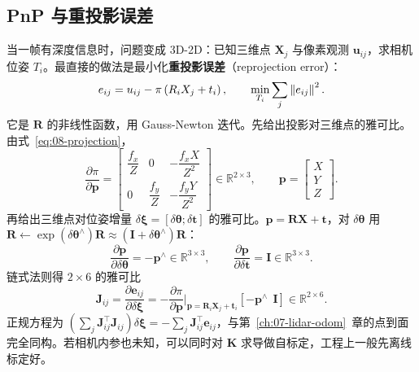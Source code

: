 \subsection{PnP 与重投影误差}

当一帧有深度信息时，问题变成 3D-2D：已知三维点 $\bm{X}_j$ 与像素观测 $\bm{u}_{ij}$，求相机位姿 $T_i$。最直接的做法是最小化\textbf{重投影误差}（reprojection error）：
\begin{equation}
  e_{ij} = u_{ij}-\pi\left(R_iX_j+t_i\right),
  \qquad
  \min_{T_i}\sum_j\left\lVert e_{ij} \right\rVert^{2}.
  \label{eq:08-reproj}
\end{equation}
它是 $\bm{R}$ 的非线性函数，用 Gauss-Newton 迭代。先给出投影对三维点的雅可比。由式~\eqref{eq:08-projection}，
\begin{equation}
  \frac{\partial\pi}{\partial\bm{p}}
  = \begin{bmatrix}
    \dfrac{f_x}{Z} & 0 & -\dfrac{f_xX}{Z^{2}}\\[2mm]
    0 & \dfrac{f_y}{Z} & -\dfrac{f_yY}{Z^{2}}
  \end{bmatrix}\in\mathbb{R}^{2\times3},
  \qquad \bm{p}=\begin{bmatrix}X\\Y\\Z\end{bmatrix}.
  \label{eq:08-dpi-dp}
\end{equation}
再给出三维点对位姿增量 $\delta\bm{\xi}=[\delta\bm{\theta};\delta\bm{t}]$ 的雅可比。$\bm{p}=\bm{R}\bm{X}+\bm{t}$，对 $\delta\bm{\theta}$ 用 $\bm{R}\leftarrow\exp(\delta\bm{\theta}^{\wedge})\bm{R}\approx(\bm{I}+\delta\bm{\theta}^{\wedge})\bm{R}$：
\begin{equation}
  \frac{\partial\bm{p}}{\partial\delta\bm{\theta}}=-\bm{p}^{\wedge}\in\mathbb{R}^{3\times3},
  \qquad
  \frac{\partial\bm{p}}{\partial\delta\bm{t}}=\bm{I}\in\mathbb{R}^{3\times3}.
\end{equation}
链式法则得 $2\times6$ 的雅可比
\begin{equation}
  \bm{J}_{ij}=\frac{\partial\bm{e}_{ij}}{\partial\delta\bm{\xi}}
  = -\frac{\partial\pi}{\partial\bm{p}}\Big|_{\bm{p}=\bm{R}_i\bm{X}_j+\bm{t}_i}
  \left[-\bm{p}^{\wedge}\ \ \bm{I}\right]\in\mathbb{R}^{2\times6}.
  \label{eq:08-reproj-jac}
\end{equation}
正规方程为 $\left(\sum_j\bm{J}_{ij}^{\top}\bm{J}_{ij}\right)\delta\bm{\xi}=-\sum_j\bm{J}_{ij}^{\top}\bm{e}_{ij}$，与第~\ref{ch:07-lidar-odom}~章的点到面完全同构。若相机内参也未知，可以同时对 $\bm{K}$ 求导做自标定，工程上一般先离线标定好。

